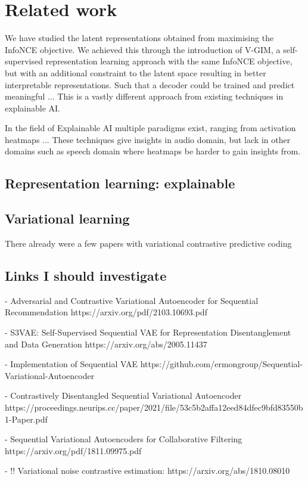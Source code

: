 
\chapter{Related work}
We have studied the latent representations obtained from maximising the InfoNCE objective. 
We achieved this through the introduction of V-GIM, a self-supervised representation learning approach with the same InfoNCE objective, but with an additional constraint to the latent space resulting in better interpretable representations. Such that a decoder could be trained and predict meaningful ...
This is a vastly different approach from existing techniques in explainable AI.

In the field of Explainable AI multiple paradigms exist, ranging from activation heatmaps ...
These techniques give insights in audio domain, but lack in other domains such as speech domain where heatmaps be harder to gain insights from.


\section{Representation learning: explainable}
\section{Variational learning}
There already were a few papers with variational contrastive predictive coding

\section{Links I should investigate}

- Adversarial and Contrastive Variational Autoencoder for Sequential Recommendation
https://arxiv.org/pdf/2103.10693.pdf

- S3VAE: Self-Supervised Sequential VAE for Representation Disentanglement and Data Generation
https://arxiv.org/abs/2005.11437

- Implementation of Sequential VAE
https://github.com/ermongroup/Sequential-Variational-Autoencoder

- Contrastively Disentangled Sequential Variational Autoencoder
https://proceedings.neurips.cc/paper/2021/file/53c5b2affa12eed84dfec9bfd83550b1-Paper.pdf

- Sequential Variational Autoencoders for Collaborative Filtering
https://arxiv.org/pdf/1811.09975.pdf

- !! Variational noise contrastive estimation:
https://arxiv.org/abs/1810.08010